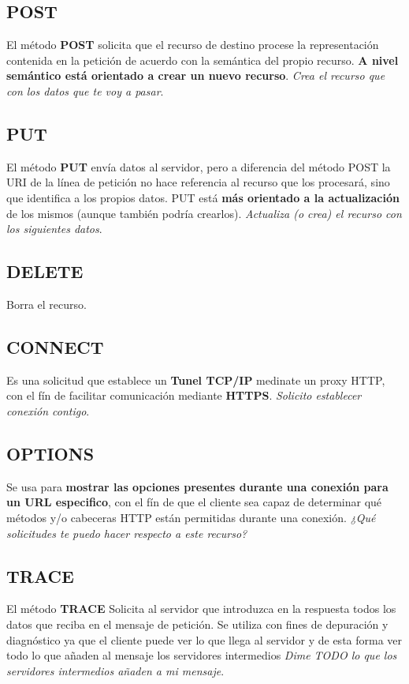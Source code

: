 \documentclass[a4paper,10pt]{article}
\begin{document}
\subsection{POST}
El método \textbf{POST} solicita que el recurso de destino procese la representación contenida en la petición de acuerdo con la semántica del propio recurso. 
\textbf{A nivel semántico está orientado a crear un nuevo recurso}.
\textit{Crea el recurso que con los  datos que te voy a pasar}.

\subsection{PUT}
El método \textbf{PUT} envía datos al servidor, pero a diferencia del método POST la URI de la línea de petición no hace referencia al recurso que los procesará, sino que identifica a los propios datos. 
PUT está \textbf{más orientado a la actualización} de los mismos (aunque también podría crearlos).
\textit{Actualiza (o crea) el recurso con los siguientes datos}.

\subsection{DELETE}
Borra el recurso.

\subsection{CONNECT}
Es una solicitud que establece un \textbf{Tunel TCP/IP} medinate un proxy HTTP, con el fín de facilitar comunicación mediante \textbf{HTTPS}.
\textit{Solicito establecer conexión contigo}. 

\subsection{OPTIONS}
Se usa para \textbf{mostrar las opciones presentes durante una conexión para un URL especifico}, con el fín de que el cliente sea capaz de determinar qué métodos y/o cabeceras HTTP están permitidas
durante una conexión.
\textit{¿Qué solicitudes te puedo hacer respecto a este recurso?}

\subsection{TRACE}
El método \textbf{TRACE} Solicita al servidor que introduzca en la respuesta todos los datos que reciba en el mensaje de petición. 
Se utiliza con fines de depuración y diagnóstico ya que el cliente puede ver lo que llega al servidor y de esta forma ver todo lo que añaden al mensaje los servidores intermedios 
\textit{Dime TODO lo que los servidores intermedios añaden a mi mensaje}.
\end{document}
